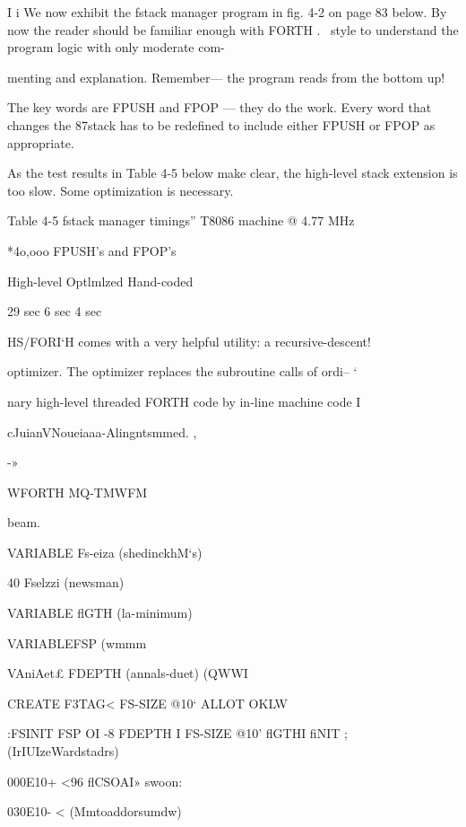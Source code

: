 {{{I
i
We now exhibit the fstack manager program in fig. 4-2 on page 83
below. By now the reader should be familiar enough with FORTH .~
style to understand the program logic with only moderate com-

menting and explanation. Remember— the program reads from
the bottom up!

The key words are FPUSH and FPOP — they do the work. Every
word that changes the 87stack has to be redefined to include
either FPUSH or FPOP as appropriate.

As the test results in Table 4-5 below make clear, the high-level
stack extension is too slow. Some optimization is necessary.

Table 4-5 fstack manager timings”
T8086 machine @ 4.77 MHz

*4o,ooo FPUSH's and FPOP's

 

High-level Optlmlzed Hand-coded

29 sec 6 sec 4 sec

 

 

 

HS/FORI‘H comes with a very helpful utility: a recursive-descent!

optimizer. The optimizer replaces the subroutine calls of ordi-- ‘

nary high-level threaded FORTH code by in-line machine code I

cJuianVNoueiaaa-Alingntsmmed. ,

 

-»

 

WFORTH MQ-TMWFM

 

\noAnmmsermman

beam.

VARIABLE Fs-eiza (shedinckhM‘s)

40 Fselzzi (newsman)

VARIABLE flGTH (la-minimum)

VARIABLEFSP (wmmm

VAniAet£ FDEPTH (annals-duet)
(QWWI

CREATE F3TAG< FS-SIZE @10‘ ALLOT OKLW

:FSINIT FSP OI -8 FDEPTH I FS-SIZE @10'
flGTHI fiNIT ; (IrIUIzeWardstadrs)

000E10+ <96 flCSOAI» swoon:

030E10- <%
(Mmtoaddorsumdw)

}}}
